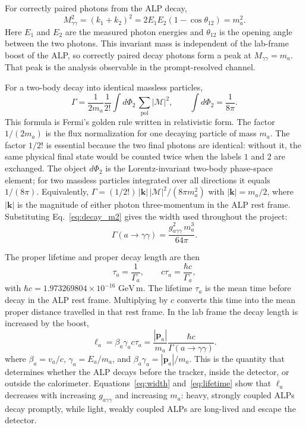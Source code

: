 \documentclass[12pt,a4paper]{article}
\newcommand{\alp}{a}
\newcommand{\gagg}{g_{a\gamma\gamma}}
\newcommand{\ma}{m_a}
\newcommand{\GeV}{\,\text{GeV}}
\begin{document}
For correctly paired photons from the ALP decay,
\begin{equation}
    M_{\gamma\gamma}^2=(k_1+k_2)^2
    =
    2E_1E_2(1-\cos\theta_{12})
    =
    \ma^2.
    \label{eq:mgg}
\end{equation}
Here $E_1$ and $E_2$ are the measured photon energies and $\theta_{12}$ is the
opening angle between the two photons. This invariant mass is independent of
the lab-frame boost of the ALP, so correctly paired decay photons form a peak
at $M_{\gamma\gamma}=\ma$. That peak is the analysis observable in the
prompt-resolved channel.

For a two-body decay into identical massless particles,
\begin{equation}
    \Gamma
    =
    \frac{1}{2\ma}\frac{1}{2!}
    \int d\Phi_2\,\sum_\mathrm{pol}|\mathcal{M}|^2,
    \qquad
    \int d\Phi_2 = \frac{1}{8\pi}.
    \label{eq:decay_phase_space}
\end{equation}
This formula is Fermi's golden rule written in relativistic form. The factor
$1/(2\ma)$ is the flux normalization for one decaying particle of mass $\ma$.
The factor $1/2!$ is essential because the two final photons are identical:
without it, the same physical final state would be counted twice when the
labels $1$ and $2$ are exchanged. The object $d\Phi_2$ is the Lorentz-invariant
two-body phase-space element; for two massless particles integrated over all
directions it equals $1/(8\pi)$. Equivalently,
$\Gamma=(1/2!)\,|\mathbf{k}|\,|\mathcal{M}|^2/(8\pi \ma^2)$ with
$|\mathbf{k}|=\ma/2$, where $|\mathbf{k}|$ is the magnitude of either photon
three-momentum in the ALP rest frame. Substituting Eq.~\eqref{eq:decay_m2}
gives the width used throughout the project:
\begin{equation}
    \Gamma(\alp\to\gamma\gamma)
    =
    \frac{\gagg^2\,\ma^3}{64\pi}.
    \label{eq:width}
\end{equation}

The proper lifetime and proper decay length are then
\begin{equation}
    \tau_a=\frac{1}{\Gamma_a},
    \qquad
    c\tau_a=\frac{\hbar c}{\Gamma_a},
    \label{eq:proper_lifetime}
\end{equation}
with $\hbar c=1.973269804\times10^{-16}\,\GeV\,\mathrm{m}$. The lifetime
$\tau_a$ is the mean time before decay in the ALP rest frame. Multiplying by
$c$ converts this time into the mean proper distance travelled in that rest
frame. In the lab frame the decay length is increased by the boost,
\begin{equation}
    \ell_\alp
    =
    \beta_a\gamma_a c\tau_a
    =
    \frac{|\mathbf{p}_a|}{\ma}
    \frac{\hbar c}{\Gamma(a\to\gamma\gamma)}.
    \label{eq:lifetime}
\end{equation}
where $\beta_a=v_a/c$, $\gamma_a=E_a/\ma$, and
$\beta_a\gamma_a=|\mathbf{p}_a|/\ma$. This is the quantity that determines
whether the ALP decays before the tracker, inside the detector, or outside the
calorimeter.
Equations~\eqref{eq:width} and~\eqref{eq:lifetime} show that $\ell_\alp$
decreases with increasing $\gagg$ and increasing $\ma$:
heavy, strongly coupled ALPs decay promptly, while light, weakly coupled ALPs
are long-lived and escape the detector.
\end{document}

